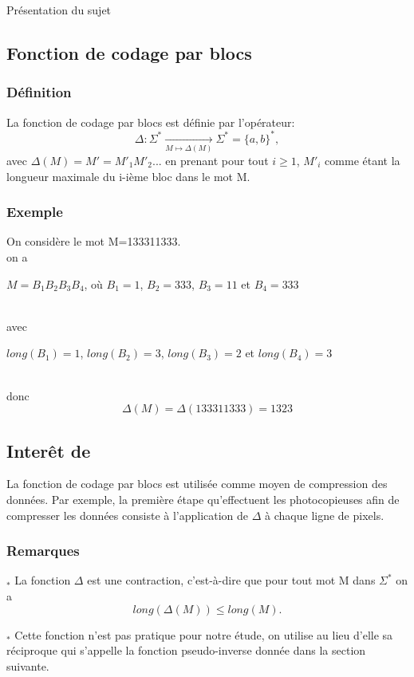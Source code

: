 \documentclass[12pt,a4paper,oneside]{book}
\begin{document}
\begin{titlepage}
\begin{chapter}{Présentation du sujet}
\subsection{Fonction de codage par blocs}
\subsubsection*{Définition}
\par La fonction de codage par blocs est définie par l'opérateur: 
 \[ \Delta: \Sigma^* \underset{M \longmapsto \Delta (M)}{\longrightarrow} \Sigma^*=\{a,b\}^*, \]
avec $\Delta(M) = M' = M'_1 M'_2 ... $ en prenant pour tout $ i \geq 1$, ${M'}_i$ comme étant la longueur maximale du i-ième bloc dans le mot M.
\subsubsection*{Exemple}
On considère le mot M=133311333.\\
on a
 \begin{center}
$M=B_1B_2B_3B_4$,\hspace{0,5\baselineskip} où $B_1=1$,\hspace{0,5\baselineskip} $B_2=333$,\hspace{0,5\baselineskip} $ B_3=11$ \hspace{0,5\baselineskip}et \hspace{0,5\baselineskip}$B_4=333$
\end{center}\\ 
avec 
\begin{center}
$long(B_1)=1$,\hspace{0,5\baselineskip} $long(B_2)=3$,\hspace{0,5\baselineskip} $long(B_3)=2$ \hspace{0,5\baselineskip} et \hspace{0,5\baselineskip} $long(B_4)=3$
\end{center}
  \\donc
 $$\Delta(M)=\Delta(133311333)=1323$$
\subsection{Inter\^et de \Delta}
\par La fonction de codage par blocs est utilisée  comme moyen de compression des données. Par exemple, la première étape qu'effectuent les photocopieuses afin de compresser les données consiste à l'application de $\Delta$ à chaque ligne de pixels.
\subsubsection*{Remarques}
\par $_*$ La fonction $\Delta$ est une contraction, c'est-à-dire que pour tout mot M dans $\Sigma^*$ on a 
$$long(\Delta(M))\leq long(M).$$
\par $_*$ Cette fonction n'est pas pratique pour notre étude, on utilise au lieu d'elle sa réciproque qui s'appelle la fonction pseudo-inverse donnée dans la section suivante. 

\end{chapter}
\end{titlepage}
\end{document}
